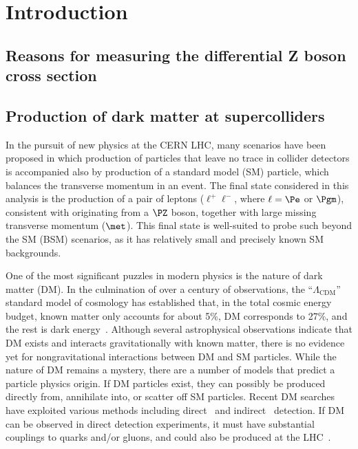 \chapter{Introduction}
\section{Reasons for measuring the differential Z boson cross section}
\section{Production of dark matter at supercolliders}
In the pursuit of new physics at the CERN LHC, many scenarios have been proposed in which production of
particles that leave no trace in collider detectors
is accompanied also by production of a standard model (SM) particle, which balances the transverse momentum in an event.
The final state considered in this analysis is the production of a pair of leptons ($\ell^{+}\ell^{-}$, where $\ell=\Pe$ or $\Pgm$),
consistent with originating from a $\PZ$ boson, together with large missing transverse momentum ($\met$).
This final state is well-suited to probe such beyond the SM (BSM) scenarios, as
it has relatively small and precisely known SM backgrounds.

One of the most significant puzzles in modern physics is the nature of dark matter (DM).
In the culmination of over a century of observations, the ``$\Lambda_{\mathrm{CDM}}$'' standard model of cosmology
has established that, in the total cosmic energy budget,
known matter only accounts for about 5\%, DM corresponds to 27\%, and the rest is dark energy~\cite{2013ApJS..208...19H}.
Although several astrophysical observations indicate that DM exists and interacts gravitationally with known matter,
there is no evidence yet for nongravitational interactions between DM and SM particles.
While the nature of DM remains a mystery, there are a number of models that predict a particle physics origin. 
If DM particles exist, they can possibly be produced directly from, annihilate into, or scatter off SM particles.
Recent DM searches have exploited various methods including direct~\cite{Cushman:2013zza} and indirect~\cite{Buckley:2013bha} detection.
If DM can be observed in direct detection experiments,
it must have substantial couplings to quarks and/or gluons, and could also be produced at the LHC~\cite{Beltran:2010ww,Goodman:2010yf,Bai:2010hh,Goodman:2010ku,Fox:2011pm,Rajaraman:2011wf}.

